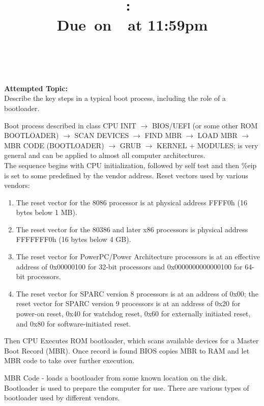 \documentclass{article}
\title{
    \vspace{2in}
    \textmd{\textbf{\hmwkClass:\ \hmwkTitle}}\\
    \normalsize\vspace{0.1in}\small{Due\ on\ \hmwkDueDate\ at 11:59pm}\\
    \vspace{0.1in}\large{\textit{\hmwkClassInstructor\ \hmwkClassTime}}
    \vspace{3in}
}
\author{\textbf{\hmwkAuthorName}}
\date{}
\begin{document}
\maketitle

\pagebreak

\textbf{Attempted Topic: }\\
Describe the key steps in a typical boot process, including the role of a bootloader.

Boot process described in class
CPU INIT $\rightarrow$ BIOS/UEFI (or some other ROM BOOTLOADER) $\rightarrow$ SCAN 
DEVICES $\rightarrow$ FIND MBR $\rightarrow$ LOAD MBR
$\rightarrow$ MBR CODE (BOOTLOADER) $\rightarrow$ GRUB $\rightarrow$ KERNEL + MODULES; 
is very general and can be applied to almost all computer architectures.\\

The sequence begins with CPU initialization, followed by self test and then \%eip  is 
set to some predefined by the vendor address.
Reset vectors used by various vendors:

\begin{enumerate}[1.]
\item The reset vector for the 8086 processor is at physical address FFFF0h (16 bytes 
below 1 MB).
\item The reset vector for the 80386 and later x86 processors is physical address
FFFFFFF0h (16 bytes below 4 GB).
\item The reset vector for PowerPC/Power Architecture processors is at an effective
address of 0x00000100 for 32-bit processors and 0x0000000000000100 for 64-bit
processors.
\item The reset vector for SPARC version 8 processors is at an address of 0x00; the 
reset vector for SPARC version 9 processors is at an address of 0x20 for power-on 
reset, 0x40 for watchdog reset, 0x60 for externally initiated reset, and 0x80 for
software-initiated reset.
\end{enumerate}

Then CPU Executes ROM bootloader, which scans available devices for a Master Boot
Record (MBR). Once record is found BIOS copies MBR to RAM and let MBR code to take over
further execution.

MBR Code - loads a bootloader from some known location on the disk. Bootloader is used 
to prepare the computer for use. There are various types of bootloader used by 
different vendors.
\end{document}
